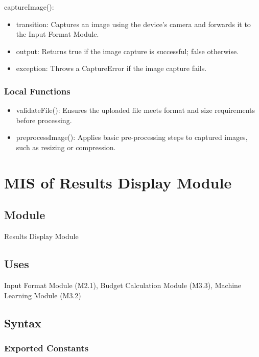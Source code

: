 \documentclass[12pt, titlepage]{article}
\begin{document}
\noindent captureImage():
\begin{itemize}
    \item transition: Captures an image using the device's camera and forwards it to the Input Format Module.
    \item output: Returns true if the image capture is successful; false otherwise.
    \item exception: Throws a CaptureError if the image capture fails.
\end{itemize}

\subsubsection{Local Functions}

\begin{itemize}
    \item validateFile(): Ensures the uploaded file meets format and size requirements before processing.
    \item preprocessImage(): Applies basic pre-processing steps to captured images, such as resizing or compression.
\end{itemize}

\newpage


\section{MIS of Results Display Module}\label{results_display_module}

\subsection{Module}

Results Display Module

\subsection{Uses}

Input Format Module (M2.1), Budget Calculation Module (M3.3), Machine Learning Module (M3.2)

\subsection{Syntax}

\subsubsection{Exported Constants}
\end{document}
